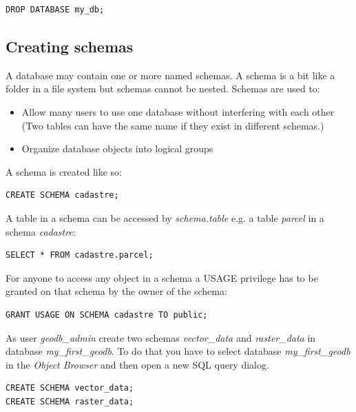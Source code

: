 \documentclass[a4paper,12pt,titlepage]{article}
\begin{document}
\begin{lstlisting}[caption={Deleting a database}]
DROP DATABASE my_db;
\end{lstlisting}

\subsection{Creating schemas}

A database may contain one or more named schemas. A schema is a bit like a folder in a file system but schemas cannot be nested. Schemas are used to:

\begin{itemize}
	\item Allow many users to use one database without interfering with each other (Two tables can have the same name if they exist in different schemas.)
	\item Organize database objects into logical groups
\end{itemize}

A schema is created like so:

\begin{lstlisting}[caption={Creating a schema}]
CREATE SCHEMA cadastre;
\end{lstlisting}

A table in a schema can be accessed by \textit{schema.table} e.g. a table \textit{parcel} in a schema \textit{cadastre}:

\begin{lstlisting}[caption={Accessing objects in a schema}]
SELECT * FROM cadastre.parcel;
\end{lstlisting}

For anyone to access any object in a schema a USAGE privilege has to be granted on that schema by the owner of the schema:

\begin{lstlisting}[caption={Granting USAGE privilege}]
GRANT USAGE ON SCHEMA cadastre TO public;
\end{lstlisting}

As user \textit{geodb\_admin} create two schemas \textit{vector\_data} and \textit{raster\_data} in database \textit{my\_first\_geodb}. To do that you have to select database \textit{my\_first\_geodb} in the \textit{Object Browser} and then open a new SQL query dialog.

\begin{lstlisting}[caption={Creating example schemas}]
CREATE SCHEMA vector_data;
CREATE SCHEMA raster_data;
\end{lstlisting}
\end{document}
